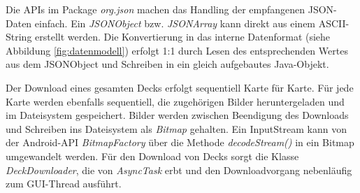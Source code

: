 Die APIs im Package \emph{org.json} machen das Handling der empfangenen JSON-Daten einfach. Ein \emph{JSONObject} bzw. \emph{JSONArray} kann direkt aus einem ASCII-String erstellt werden. Die Konvertierung in das interne Datenformat (siehe Abbildung \ref{fig:datenmodell}) erfolgt 1:1 durch Lesen des entsprechenden Wertes aus dem JSONObject und Schreiben in ein gleich aufgebautes Java-Objekt.

Der Download eines gesamten Decks erfolgt sequentiell Karte für Karte. Für jede Karte werden ebenfalls sequentiell, die zugehörigen Bilder heruntergeladen und im Dateisystem gespeichert. Bilder werden zwischen Beendigung des Downloads und Schreiben ins Dateisystem als \emph{Bitmap} gehalten. Ein InputStream kann von der Android-API \emph{BitmapFactory} über die Methode \emph{decodeStream()} in ein Bitmap umgewandelt werden. Für den Download von Decks sorgt die Klasse \emph{DeckDownloader}, die von \emph{AsyncTask} erbt und den Downloadvorgang nebenläufig zum GUI-Thread ausführt.